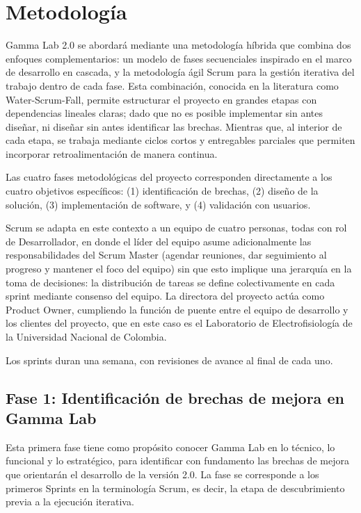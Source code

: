 \documentclass[12pt,letterpaper]{article}
\begin{document}
\section{Metodología}

 Gamma Lab 2.0 se abordará mediante una metodología híbrida que combina dos enfoques complementarios: un modelo de fases secuenciales inspirado en el marco de desarrollo en cascada, y la metodología ágil Scrum para la gestión iterativa del trabajo dentro de cada fase. Esta combinación, conocida en la literatura como Water-Scrum-Fall, permite estructurar el proyecto en grandes etapas con dependencias lineales claras; dado que no es posible implementar sin antes diseñar, ni diseñar sin antes identificar las brechas. Mientras que, al interior de cada etapa, se trabaja mediante ciclos cortos y entregables parciales que permiten incorporar retroalimentación de manera continua.

Las cuatro fases metodológicas del proyecto corresponden directamente a los cuatro objetivos específicos: (1) identificación de brechas, (2) diseño de la solución, (3) implementación de software, y (4) validación con usuarios.

Scrum se adapta en este contexto a un equipo de cuatro personas, todas con rol de Desarrollador, en donde el líder del equipo asume adicionalmente las responsabilidades del Scrum Master (agendar reuniones, dar seguimiento al progreso y mantener el foco del equipo) sin que esto implique una jerarquía en la toma de decisiones: la distribución de tareas se define colectivamente en cada sprint mediante consenso del equipo. La directora del proyecto actúa como Product Owner, cumpliendo la función de puente entre el equipo de desarrollo y los clientes del proyecto, que en este caso es el Laboratorio de Electrofisiología de la Universidad Nacional de Colombia.

Los sprints duran una semana, con revisiones de avance al final de cada uno.




\subsection{Fase 1: Identificación de brechas de mejora en Gamma Lab}

Esta primera fase tiene como propósito conocer Gamma Lab en lo técnico, lo funcional y lo estratégico, para identificar con fundamento las brechas de mejora que orientarán el desarrollo de la versión 2.0. La fase se corresponde a los primeros Sprints en la terminología Scrum, es decir, la etapa de descubrimiento previa a la ejecución iterativa.
\end{document}
